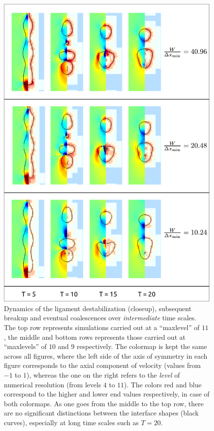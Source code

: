 \begin{figure}
\centering
\includegraphics{plots/ligament_breakup/resolution_compare.pdf}
	\caption{Dynamics of the ligament destabilization (closeup), subsequent breakup 
	and eventual coalescences over \textit{intermediate} time scales.
	The top row represents simulations carried out at a ``maxlevel'' of $11$,
	the middle and bottom rows represents those carried out at ``maxlevels'' of
	$10$ and $9$ respectively. 
	The colormap is kept the same across all figures, where the left 
	side of the axis of symmetry in each figure corresponds to the axial component of 
	velocity (values from $-1$ to $1$), whereas the one on the right refers to 
	the \textit{level} of numerical resolution (from levels $4$ to $11$). 
	The colors red and blue correspond to the higher and lower 
	end values respectively, in case of both colormaps. 
	As one goes from the middle to the top row, there are no significant distinctions 
	between the interface shapes (black curves), especially at long time scales such as $T=20$. 
	}
\label{res_comp}
\end{figure}



